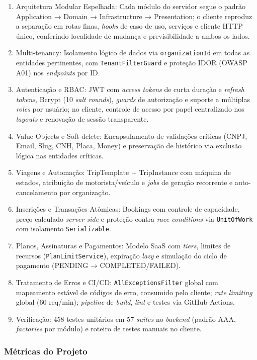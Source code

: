 \documentclass[12pt,openright,oneside,a4paper]{article}
\begin{document}
\begin{enumerate}
\item Arquitetura Modular Espelhada: Cada módulo do servidor segue o padrão Application → Domain → Infrastructure → Presentation; o cliente reproduz a separação em rotas finas, \textit{hooks} de caso de uso, serviços e cliente HTTP único, conferindo localidade de mudança e previsibilidade a ambos os lados.
\item Multi-tenancy: Isolamento lógico de dados via \texttt{organizationId} em todas as entidades pertinentes, com \texttt{TenantFilterGuard} e proteção IDOR (OWASP A01) nos \textit{endpoints} por ID.
\item Autenticação e RBAC: JWT com \textit{access tokens} de curta duração e \textit{refresh tokens}, Bcrypt (10 \textit{salt rounds}), \textit{guards} de autorização e suporte a múltiplas \textit{roles} por usuário; no cliente, controle de acesso por papel centralizado nos \textit{layouts} e renovação de sessão transparente.
\item Value Objects e Soft-delete: Encapsulamento de validações críticas (CNPJ, Email, Slug, CNH, Placa, Money) e preservação de histórico via exclusão lógica nas entidades críticas.
\item Viagens e Automação: TripTemplate + TripInstance com máquina de estados, atribuição de motorista/veículo e \textit{jobs} de geração recorrente e auto-cancelamento por organização.
\item Inscrições e Transações Atômicas: Bookings com controle de capacidade, preço calculado \textit{server-side} e proteção contra \textit{race conditions} via \texttt{UnitOfWork} com isolamento \texttt{Serializable}.
\item Planos, Assinaturas e Pagamentos: Modelo SaaS com \textit{tiers}, limites de recursos (\texttt{PlanLimitService}), expiração \textit{lazy} e simulação do ciclo de pagamento (PENDING → COMPLETED/FAILED).
\item Tratamento de Erros e CI/CD: \texttt{AllExceptionsFilter} global com mapeamento estável de códigos de erro, consumido pelo cliente; \textit{rate limiting} global (60 req/min); \textit{pipeline} de \textit{build}, \textit{lint} e testes via GitHub Actions.
\item Verificação: 458 testes unitários em 57 \textit{suites} no \textit{backend} (padrão AAA, \textit{factories} por módulo) e roteiro de testes manuais no cliente.
\end{enumerate}

\subsubsection{Métricas do Projeto}
\end{document}
